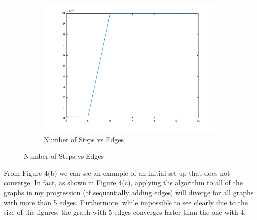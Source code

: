 \documentclass{article}
\begin{document}
\begin{figure}[h!]
\begin{subfigure}[t]{0.3\textwidth}
\includegraphics[width=\textwidth]{p3_convergence_steps.png}
\caption{Number of Steps vs Edges}
\end{subfigure}
\end{figure}
From Figure 4(b) we can see an example of an initial set up that does not
converge. In fact, as shown in Figure 4(c), applying the algorithm to all of the
graphs in my progression (of sequentially adding edges) will diverge for all
graphs with more than 5 edges. Furthermore, while impossible to see clearly due
to the size of the figures, the graph with 5 edges converges faster than the one
with 4. 
\end{document}
